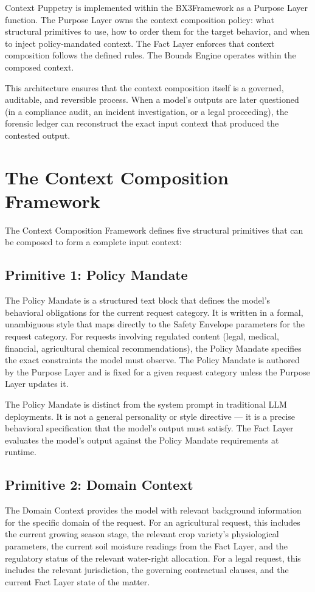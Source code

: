 \documentclass[12pt]{article}
\def\bxthree{BX3}
\begin{document}
Context Puppetry is implemented within the \bxthree Framework as a Purpose Layer function. The Purpose Layer owns the context composition policy: what structural primitives to use, how to order them for the target behavior, and when to inject policy-mandated context. The Fact Layer enforces that context composition follows the defined rules. The Bounds Engine operates within the composed context.

This architecture ensures that the context composition itself is a governed, auditable, and reversible process. When a model's outputs are later questioned (in a compliance audit, an incident investigation, or a legal proceeding), the forensic ledger can reconstruct the exact input context that produced the contested output.

\section{The Context Composition Framework}
The Context Composition Framework defines five structural primitives that can be composed to form a complete input context:

\subsection{Primitive 1: Policy Mandate}
The Policy Mandate is a structured text block that defines the model's behavioral obligations for the current request category. It is written in a formal, unambiguous style that maps directly to the Safety Envelope parameters for the request category. For requests involving regulated content (legal, medical, financial, agricultural chemical recommendations), the Policy Mandate specifies the exact constraints the model must observe. The Policy Mandate is authored by the Purpose Layer and is fixed for a given request category unless the Purpose Layer updates it.

The Policy Mandate is distinct from the system prompt in traditional LLM deployments. It is not a general personality or style directive --- it is a precise behavioral specification that the model's output must satisfy. The Fact Layer evaluates the model's output against the Policy Mandate requirements at runtime.

\subsection{Primitive 2: Domain Context}
The Domain Context provides the model with relevant background information for the specific domain of the request. For an agricultural request, this includes the current growing season stage, the relevant crop variety's physiological parameters, the current soil moisture readings from the Fact Layer, and the regulatory status of the relevant water-right allocation. For a legal request, this includes the relevant jurisdiction, the governing contractual clauses, and the current Fact Layer state of the matter.
\end{document}
